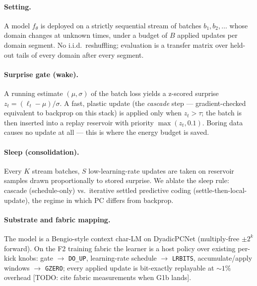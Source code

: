 \documentclass[11pt]{article}
\newcommand{\todo}[1]{\textcolor{red!70!black}{[TODO: #1]}}
\begin{document}
\paragraph{Setting.} A model $f_\theta$ is deployed on a strictly sequential stream of batches
$b_1, b_2, \dots$ whose domain changes at unknown times, under a budget of $B$ applied updates
per domain segment. No i.i.d.\ reshuffling; evaluation is a transfer matrix over held-out
tails of every domain after every segment.

\paragraph{Surprise gate (wake).} A running estimate $(\mu,\sigma)$ of the batch loss yields a
z-scored surprise $z_t = (\ell_t-\mu)/\sigma$. A fast, plastic update (the \emph{cascade} step
--- gradient-checked equivalent to backprop on this stack) is applied only when $z_t > \tau$;
the batch is then inserted into a replay reservoir with priority $\max(z_t, 0.1)$. Boring data
causes no update at all --- this is where the energy budget is saved.

\paragraph{Sleep (consolidation).} Every $K$ stream batches, $S$ low-learning-rate updates are
taken on reservoir samples drawn proportionally to stored surprise. We ablate the sleep rule:
cascade (schedule-only) vs.\ iterative settled predictive coding (settle-then-local-update),
the regime in which PC differs from backprop.

\paragraph{Substrate and fabric mapping.} The model is a Bengio-style context char-LM on
DyadicPCNet (multiply-free $\pm2^k$ forward). On the F2 training fabric the learner is a host
policy over existing per-kick knobs: gate $\to$ \texttt{DO\_UP}, learning-rate schedule $\to$
\texttt{LRBITS}, accumulate/apply windows $\to$ \texttt{GZERO}; every applied update is
bit-exactly replayable at ${\sim}1\%$ overhead \todo{cite fabric measurements when G1b lands}.
\end{document}
